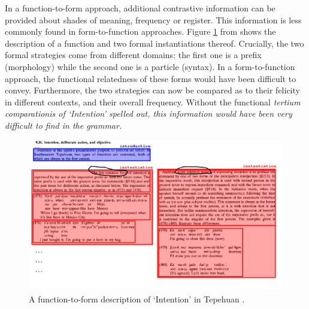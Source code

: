 \documentclass[a4paper,12pt]{article}
\begin{document}
In a function-to-form approach, additional contrastive information can be provided about shades of meaning, frequency or register. This information is less commonly found in form-to-function approaches. Figure \ref{fig:tepehuan} from \citet{Willett1991} shows the description of a function and two formal instantiations thereof. Crucially, the two formal strategies come from different domains: the first one is a prefix (morphology) while the second one is a particle (syntax). In a form-to-function approach, the functional relatedness of these forms would have been difficult to convey. Furthermore, the two strategies can now be compared as to their felicity in different contexts, and their overall frequency. Without the functional \em tertium comparationis \em of `Intention' spelled out, this information would have been very difficult to find in the grammar.

\begin{figure}
 \centering
 \includegraphics[width=\textwidth]{./tepehuan.png}
 \caption{A function-to-form description of `Intention' in Tepehuan \citep{Willett1991}.}
 \label{fig:tepehuan}
\end{figure}
\end{document}
